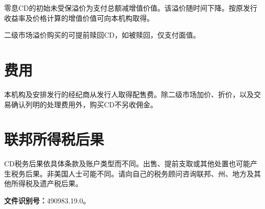 \documentclass[UTF8,fontset=none,11pt,a4paper]{ctexart}
\begin{document}
零息CD的初始未受保溢价为支付总额减增值价值。该溢价随时间下降。按原发行收益率及价格计算的增值价值可向本\allowbreak\mbox{机构取得。}


二级市场溢价购买的可提前赎回CD，如被赎回，仅\allowbreak\mbox{支付面值。}


\section*{费用}
本机构及安排发行的经纪商从发行人取得配售费。除二级市场加价、折价，以及交易确认列明的处理费用外，购买CD不\allowbreak\mbox{另收佣金。}


\section*{联邦所得税后果}
CD税务后果依具体条款及账户类型而不同。出售、提前支取或其他处置也可能产生税务后果。非美国人士可能不同。请向自己的税务顾问咨询联邦、州、地方及其他所得税及遗\allowbreak\mbox{产税后果。}


\textbf{文件识别号：}490983.19.0。
\end{document}
